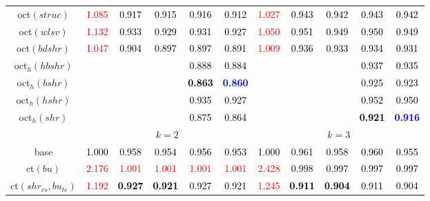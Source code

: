 \begin{tabular}[t]{c|>{}cccc>{}c|ccccc}
oct$(struc)$ & \textcolor{red}{1.085} & \textcolor{black}{0.917} & \textcolor{black}{0.915} & \textcolor{black}{0.916} & \textcolor{black}{0.912} & \textcolor{red}{1.027} & \textcolor{black}{0.943} & \textcolor{black}{0.942} & \textcolor{black}{0.943} & \textcolor{black}{0.942}\\
oct$(wlsv)$ & \textcolor{red}{1.132} & \textcolor{black}{0.933} & \textcolor{black}{0.929} & \textcolor{black}{0.931} & \textcolor{black}{0.927} & \textcolor{red}{1.050} & \textcolor{black}{0.951} & \textcolor{black}{0.949} & \textcolor{black}{0.950} & \textcolor{black}{0.949}\\
oct$(bdshr)$ & \textcolor{red}{1.047} & \textcolor{black}{0.904} & \textcolor{black}{0.897} & \textcolor{black}{0.897} & \textcolor{black}{0.891} & \textcolor{red}{1.009} & \textcolor{black}{0.936} & \textcolor{black}{0.933} & \textcolor{black}{0.934} & \textcolor{black}{0.931}\\
oct$_h(hbshr)$ &  &  &  & \textcolor{black}{0.888} & \textcolor{black}{0.884} &  &  &  & \textcolor{black}{0.937} & \textcolor{black}{0.935}\\
oct$_h(bshr)$ &  &  &  & \textcolor{black}{\textbf{0.863}} & \textcolor{blue}{\textbf{0.860}} &  &  &  & \textcolor{black}{0.925} & \textcolor{black}{0.923}\\
oct$_h(hshr)$ &  &  &  & \textcolor{black}{0.935} & \textcolor{black}{0.927} &  &  &  & \textcolor{black}{0.952} & \textcolor{black}{0.950}\\
oct$_h(shr)$ &  &  &  & \textcolor{black}{0.875} & \textcolor{black}{0.864} &  &  &  & \textcolor{black}{\textbf{0.921}} & \textcolor{blue}{\textbf{0.916}}\\
\addlinespace[0.3em]
\multicolumn{1}{c}{} & \multicolumn{5}{c}{\textbf{$k = 2$}} & \multicolumn{5}{c}{\textbf{$k = 3$}}\\
base & \textcolor{black}{1.000} & \textcolor{black}{0.958} & \textcolor{black}{0.954} & \textcolor{black}{0.956} & \textcolor{black}{0.953} & \textcolor{black}{1.000} & \textcolor{black}{0.961} & \textcolor{black}{0.958} & \textcolor{black}{0.960} & \textcolor{black}{0.955}\\
ct$(bu)$ & \textcolor{red}{2.176} & \textcolor{red}{1.001} & \textcolor{red}{1.001} & \textcolor{red}{1.001} & \textcolor{red}{1.001} & \textcolor{red}{2.428} & \textcolor{black}{0.998} & \textcolor{black}{0.997} & \textcolor{black}{0.997} & \textcolor{black}{0.997}\\
ct$(shr_{cs}, bu_{te})$ & \textcolor{red}{1.192} & \textcolor{black}{\textbf{0.927}} & \textcolor{black}{\textbf{0.921}} & \textcolor{black}{0.927} & \textcolor{black}{0.921} & \textcolor{red}{1.245} & \textcolor{black}{\textbf{0.911}} & \textcolor{black}{\textbf{0.904}} & \textcolor{black}{0.911} & \textcolor{black}{0.904}\\

\end{tabular}
